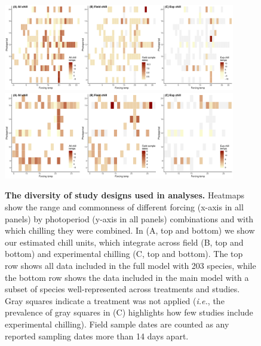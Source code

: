 \documentclass{article}
\begin{document}
\newpage
\begin{figure}[h!]
\centering
\noindent \includegraphics[width=0.9\textwidth]{..//..//analyses/bb_analysis/figures/studydesign/EDFig3_studydesign_heat3panelallsppmodel.pdf}
\noindent \includegraphics[width=0.9\textwidth]{..//..//analyses/bb_analysis/figures/studydesign/studydesign_heat3panelmainmodel.pdf}
\caption{\textbf{The diversity of study designs used in analyses.} Heatmaps show the range and commonness of different forcing (x-axis in all panels) by photoperiod (y-axis in all panels) combinations and with which chilling they were combined. In (A, top and bottom) we show our estimated chill units, which integrate across field (B, top and bottom) and experimental chilling (C, top and bottom). The top row shows all data included in the full model with 203 species, while the bottom row shows the data included in the main model with a subset of species well-represented across treatments and studies. Gray squares indicate a treatment was not applied (\emph{i.e.}, the prevalence of gray squares in (C) highlights how few studies include experimental chilling). Field sample dates are counted as any reported sampling dates more than 14 days apart.}
\label{fig:treatheatmaps}
\end{figure}
\end{document}
